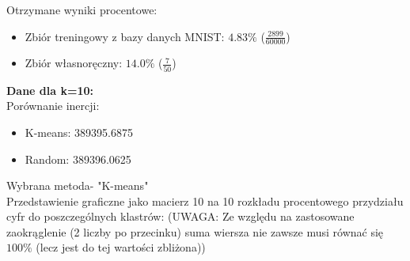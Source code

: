 \documentclass[a4paper,14pt]{report}
\begin{document}
	Otrzymane wyniki procentowe:
	\begin{itemize}
		\item Zbiór treningowy z bazy danych MNIST: $4.83\%$ ($\frac{2899}{60000}$)
		\item Zbiór własnoręczny: $14.0\%$ ($\frac{7}{50}$)
	\end{itemize}
	\textbf{Dane dla k=10: } \\
	Porównanie inercji: 
	\begin{itemize}
		\item K-means: 389395.6875
		\item Random: 389396.0625
	\end{itemize}
	Wybrana metoda- "K-means" \\
	Przedstawienie graficzne jako macierz 10 na 10 rozkładu procentowego przydziału cyfr do poszczególnych klastrów:
	(UWAGA: Ze względu na zastosowane zaokrąglenie (2 liczby po przecinku) suma wiersza nie zawsze musi równać się $100\%$ (lecz jest do tej wartości zbliżona))
\end{document}

